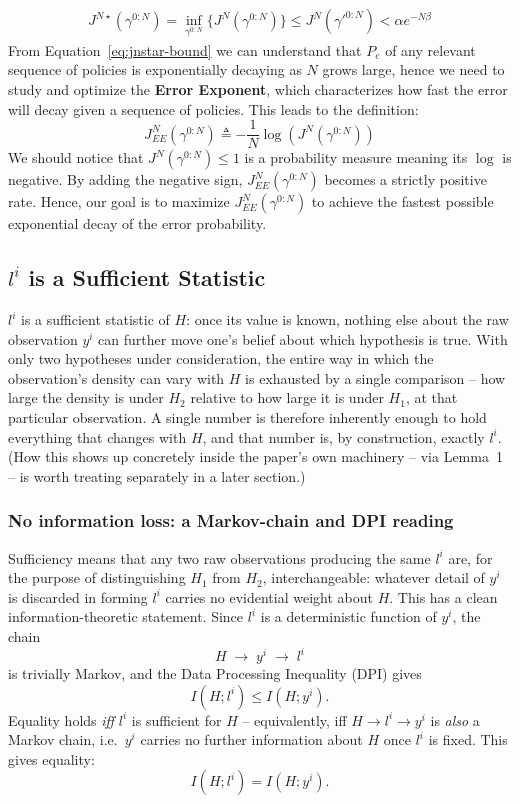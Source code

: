 \documentclass[11pt]{article}
\begin{document}
\begin{align}
     J^{N\star}(\gamma^{0:N}) = \inf_{\gamma^{0:N}}\{J^N(\gamma^{0:N})\} \leq J^{N}({\gamma'}^{0:N}) < \alpha e^{-N \beta} \label{eq:jnstar-bound}
\end{align}
From Equation~\eqref{eq:jnstar-bound} we can understand that $P_{e}$ of any relevant sequence of policies is exponentially decaying as $N$ grows large, hence we
need to study and optimize the \textbf{Error Exponent}, which characterizes how fast the error will decay given a sequence of policies. This leads to the definition:
\begin{equation}
    J_{EE}^{N}(\gamma^{0:N}) \triangleq -\frac{1}{N}\log(J^{N}(\gamma^{0:N})) \label{eq:error-exponent-def}
\end{equation}
We should notice that $J^{N}(\gamma^{0:N}) \le 1$ is a probability measure meaning its $\log$ is negative. By adding the negative sign, $J_{EE}^{N}(\gamma^{0:N})$ becomes a strictly positive rate. Hence, our goal is to maximize $J_{EE}^{N}(\gamma^{0:N})$ to achieve the fastest possible exponential decay of the error probability.
\subsection{$l^i$ is a Sufficient Statistic}
\label{sec:sufficient-statistic}
$l^i$ is a sufficient statistic of $H$: once its value is known, nothing else
about the raw observation $y^i$ can further move one's belief about which
hypothesis is true. With only two hypotheses under consideration, the entire way in which
the observation's density can vary with $H$ is exhausted by a single comparison --
how large the density is under $H_2$ relative to how large it is under $H_1$, at
that particular observation. A single number is therefore inherently enough to
hold everything that changes with $H$, and that number is, by construction,
exactly $l^i$. (How this shows up concretely inside the paper's own machinery --
via Lemma~1 -- is worth treating separately in a later section.)

\subsubsection*{No information loss: a Markov-chain and DPI reading}
Sufficiency means that any two raw observations producing the same $l^i$ are, for
the purpose of distinguishing $H_1$ from $H_2$, interchangeable: whatever detail of
$y^i$ is discarded in forming $l^i$ carries no evidential weight about $H$. This
has a clean information-theoretic statement. Since $l^i$ is a deterministic
function of $y^i$, the chain
\[
    H \;\to\; y^i \;\to\; l^i
\]
is trivially Markov, and the Data Processing Inequality (DPI) gives
\begin{equation}
    I(H; l^i) \le I(H; y^i).
\end{equation}
Equality holds \emph{iff} $l^i$ is sufficient for $H$ -- equivalently, iff
$H \to l^i \to y^i$ is \emph{also} a Markov chain, i.e.\ $y^i$ carries no further
information about $H$ once $l^i$ is fixed. This gives equality:
\begin{equation}
    I(H; l^i) = I(H; y^i).
\end{equation}
\end{document}

